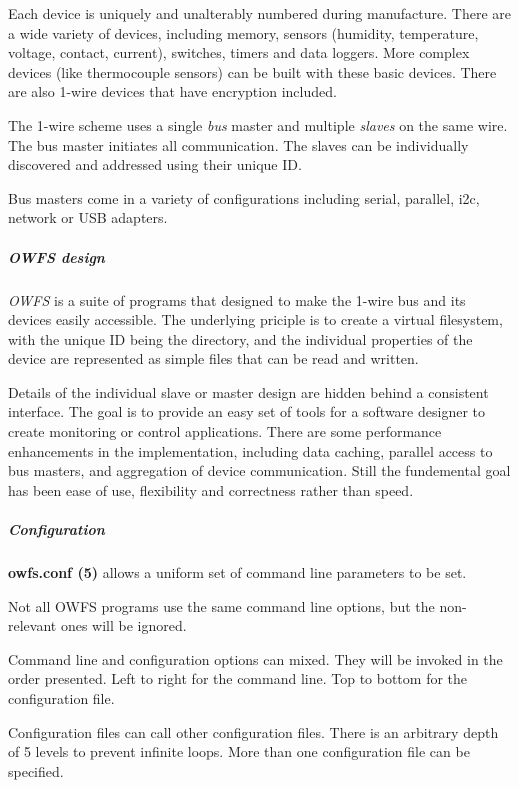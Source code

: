 Each device is uniquely and unalterably numbered
during manufacture. There are a wide variety of devices, including memory,
sensors (humidity, temperature, voltage, contact, current), switches, timers
and data loggers. More complex devices (like thermocouple sensors) can be
built with these basic devices. There are also 1-wire devices that have encryption
included. 

The 1-wire scheme uses a single  \textit{bus} master and multiple \textit{slaves}
on the same wire. The bus master initiates all communication. The slaves
can be  individually discovered and addressed using their unique ID. 

Bus
masters come in a variety of configurations including serial, parallel,
i2c, network or USB adapters. 
\subparagraph*{OWFS design}\textit{OWFS} is a suite of programs that
designed to make the 1-wire bus and its devices easily accessible. The underlying
priciple is to create a virtual filesystem, with the unique ID being the
directory, and the individual properties of the device are represented
as simple files that can be read and written. 

Details of the individual
slave or master design are hidden behind a consistent interface. The goal
is to  provide an easy set of tools for a software designer to create monitoring
or control applications. There  are some performance enhancements in the
implementation, including data caching, parallel access to bus  masters,
and aggregation of device communication. Still the fundemental goal has
been ease of use, flexibility  and correctness rather than speed.  
\subparagraph*{Configuration}\textsf{\textbf{owfs.conf
(5)}} allows a uniform set of command line parameters to be set. 

Not all OWFS
programs use the same command line options, but the non-relevant ones will
be ignored. 

Command line and configuration options can mixed. They will be
invoked in the order presented. Left to right for the command line. Top to
bottom for the configuration file. 

Configuration files can call other configuration
files. There is an arbitrary depth of 5 levels to prevent infinite loops.
More than one configuration file can be specified. 
